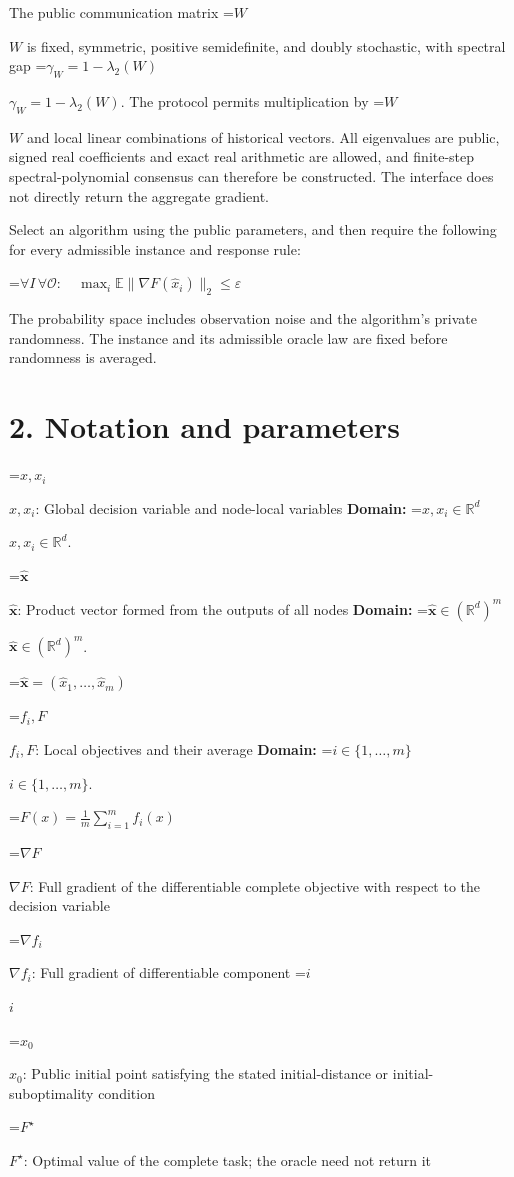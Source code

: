 \documentclass[10pt,a4paper]{article}
\newcommand{\AtlasMath}[1]{\par\begingroup\centering\setbox0=\hbox{$\displaystyle #1$}\ifdim\wd0>1.4\linewidth\typeout{ATLAS WIDE FORMULA: \the\wd0}\fi\ifdim\wd0>\linewidth\resizebox{\linewidth}{!}{\box0}\else\box0\fi\par\endgroup}
\newcommand{\AtlasInlineMath}[1]{\begingroup\setbox0=\hbox{$#1$}\ifdim\wd0>.4\linewidth\endgroup\AtlasMath{#1}\else\endgroup$#1$\fi}
\begin{document}
The public communication matrix \AtlasInlineMath{W} is fixed, symmetric, positive semidefinite, and doubly stochastic, with spectral gap \AtlasInlineMath{\gamma_W=1-\lambda_2(W)}. The protocol permits multiplication by \AtlasInlineMath{W} and local linear combinations of historical vectors. All eigenvalues are public, signed real coefficients and exact real arithmetic are allowed, and finite-step spectral-polynomial consensus can therefore be constructed. The interface does not directly return the aggregate gradient.

Select an algorithm using the public parameters, and then require the following for every admissible instance and response rule:


\AtlasMath{\forall I\,\forall\mathcal{O}:\quad\max_i\mathbb{E}\|\nabla F(\widehat{x}_i)\|_2\le\varepsilon}


The probability space includes observation noise and the algorithm's private randomness. The instance and its admissible oracle law are fixed before randomness is averaged.

\section{2. Notation and parameters}
\AtlasInlineMath{x,x_i}: Global decision variable and node-local variables \textbf{Domain:} \AtlasInlineMath{x,x_i\in \mathbb{R}^d}.

\AtlasInlineMath{\widehat{\boldsymbol x}}: Product vector formed from the outputs of all nodes \textbf{Domain:} \AtlasInlineMath{\widehat{\boldsymbol x}\in (\mathbb{R}^d)^m}.


\AtlasMath{\widehat{\boldsymbol x}=(\widehat{x}_1,\ldots,\widehat{x}_m)}


\AtlasInlineMath{f_i,F}: Local objectives and their average \textbf{Domain:} \AtlasInlineMath{i\in\{1,\ldots,m\}}.


\AtlasMath{F(x)=\frac1m\sum_{i=1}^m f_i(x)}


\AtlasInlineMath{\nabla F}: Full gradient of the differentiable complete objective with respect to the decision variable

\AtlasInlineMath{\nabla f_i}: Full gradient of differentiable component \AtlasInlineMath{i}

\AtlasInlineMath{x_0}: Public initial point satisfying the stated initial-distance or initial-suboptimality condition

\AtlasInlineMath{F^\star}: Optimal value of the complete task; the oracle need not return it
\end{document}
